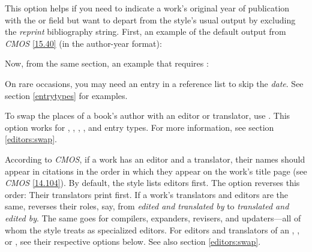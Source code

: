 \documentclass[11pt,letterpaper,oneside]{article}
\begin{document}
\begin{optionlist}

\noindent This option helps if you need to indicate a work's original
year of publication with the  or
 field but want to depart from the style's usual
output by excluding the \textit{reprint} bibliography string. First,
an example of the default output from \textit{CMOS} \ref{15.40} (in
the author-year format):

\begin{refonly}
\nocite{maitland1998}
\end{refonly}

\noindent Now, from the same section, an example that requires
:

\begin{refonly}
\nocite{darwin1964}
\end{refonly}


\noindent On rare occasions, you may need an entry in a reference list
to skip the \textit{date}. See section \ref{entrytypes} for examples.


\noindent To swap the places of a book's author with an editor or
translator, use . This option works for ,
, , , and
 entry types. For more information, see section
\ref{editors:swap}.


\noindent According to \textit{CMOS}, if a work has an editor and a
translator, their names should appear in citations in the order in
which they appear on the work's title page (see \textit{CMOS}
\ref{14.104}). By default, the style lists editors first. The option
 reverses this order: Their translators print
first. If a work's translators and editors are the same,
 reverses their roles, say, from \textit{edited
and translated by} to \textit{translated and edited by}. The same goes
for compilers, expanders, revisers, and updaters---all of whom the
style treats as specialized editors. For editors and translators of an
, , or , see
their respective options below. See also section \ref{editors:swap}.



\end{optionlist}
\end{document}
